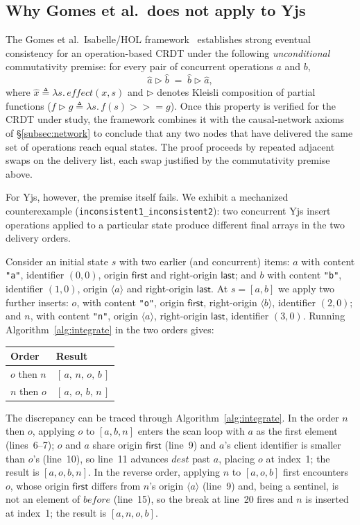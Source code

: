 \documentclass[sigplan,screen]{acmart}
\newcommand{\leanref}[1]{\texttt{#1}}
\newcommand{\First}{\mathsf{first}}
\newcommand{\Last}{\mathsf{last}}
\newcommand{\effect}{\mathit{effect}}
\newcommand{\kleisli}{\mathbin{\triangleright}}
\begin{document}
\subsection{Why Gomes et al.\ does not apply to Yjs}
\label{subsec:why-gomes}

The Gomes et al.\ Isabelle/HOL framework~\cite{Gomes2017} establishes
strong eventual consistency for an operation-based CRDT under the
following \emph{unconditional} commutativity premise: for every pair of
concurrent operations $a$ and $b$,
\[
  \hat{a} \kleisli \hat{b} \;=\; \hat{b} \kleisli \hat{a},
\]
where $\hat{x} \triangleq \lambda s.\,\effect(x, s)$ and $\kleisli$
denotes Kleisli composition of partial functions
($f \kleisli g \triangleq \lambda s.\, f(s) \mathbin{>\!\!>\!=} g$).
Once this property is verified for the CRDT under study, the framework
combines it with the causal-network axioms of \S\ref{subsec:network} to
conclude that any two nodes that have delivered the same set of
operations reach equal states.  The proof proceeds by repeated adjacent
swaps on the delivery list, each swap justified by the commutativity
premise above.

For Yjs, however, the premise itself fails.  We exhibit a mechanized
counterexample (\leanref{inconsistent1\_inconsistent2}): two concurrent
Yjs insert operations applied to a particular state produce different
final arrays in the two delivery orders.

Consider an initial state $s$ with two earlier (and concurrent) items:
$a$ with content \texttt{"a"}, identifier $(0,0)$, origin $\First$ and
right-origin $\Last$; and $b$ with content \texttt{"b"}, identifier
$(1,0)$, origin $\langle a \rangle$ and right-origin $\Last$.  At
$s = [a, b]$ we apply two further inserts: $o$, with content
\texttt{"o"}, origin $\First$, right-origin $\langle b \rangle$,
identifier $(2,0)$; and $n$, with content \texttt{"n"}, origin
$\langle a \rangle$, right-origin $\Last$, identifier $(3,0)$.
Running Algorithm~\ref{alg:integrate} in the two orders gives:
\begin{center}
\begin{tabular}{ll}
  Order & Result \\
  \hline
  $o$ then $n$ & $[\,a,\, n,\, o,\, b\,]$ \\
  $n$ then $o$ & $[\,a,\, o,\, b,\, n\,]$
\end{tabular}
\end{center}
The discrepancy can be traced through Algorithm~\ref{alg:integrate}.  In
the order $n$ then $o$, applying $o$ to $[a, b, n]$ enters the scan
loop with $a$ as the first element (lines~6--7); $o$ and $a$ share
origin $\First$ (line~9) and $a$'s client identifier is smaller than
$o$'s (line~10), so line~11 advances $\mathit{dest}$ past $a$, placing
$o$ at index~1; the result is $[a, o, b, n]$.  In the reverse order,
applying $n$ to $[a, o, b]$ first encounters $o$, whose origin $\First$
differs from $n$'s origin $\langle a \rangle$ (line~9) and, being a
sentinel, is not an element of $\mathit{before}$ (line~15), so the
break at line~20 fires and $n$ is inserted at index~1; the result is
$[a, n, o, b]$.
\end{document}
